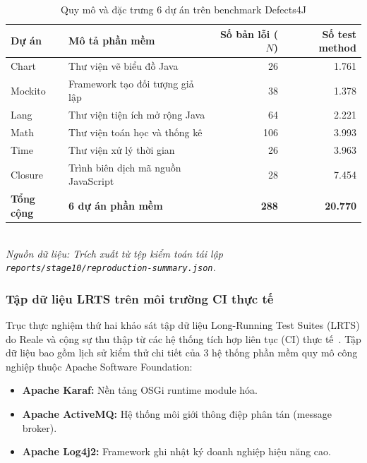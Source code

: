 \begin{table}[H]
\centering
\caption{Quy mô và đặc trưng 6 dự án trên benchmark Defects4J}
\label{tab:defects4j_stats}
\small
\begin{tabular*}{\textwidth}{@{\extracolsep{\fill}}llrr}
\toprule
\textbf{Dự án} & \textbf{Mô tả phần mềm} & \textbf{Số bản lỗi ($N$)} & \textbf{Số test method} \\
\midrule
Chart   & Thư viện vẽ biểu đồ Java            & 26  & 1.761 \\
Mockito & Framework tạo đối tượng giả lập     & 38  & 1.378 \\
Lang    & Thư viện tiện ích mở rộng Java      & 64  & 2.221 \\
Math    & Thư viện toán học và thống kê       & 106 & 3.993 \\
Time    & Thư viện xử lý thời gian            & 26  & 3.963 \\
Closure & Trình biên dịch mã nguồn JavaScript & 28  & 7.454 \\
\midrule
\textbf{Tổng cộng} & \textbf{6 dự án phần mềm} & \textbf{288} & \textbf{20.770} \\
\bottomrule
\end{tabular*}
\vspace{1mm}\\
\footnotesize{\textit{Nguồn dữ liệu: Trích xuất từ tệp kiểm toán tái lập \texttt{reports/stage10/reproduction-summary.json}.}}
\end{table}

\subsubsection{Tập dữ liệu LRTS trên môi trường CI thực tế}
\label{subsubsec:lrts_dataset}

Trục thực nghiệm thứ hai khảo sát tập dữ liệu Long-Running Test Suites (LRTS) do Reale và cộng sự thu thập từ các hệ thống tích hợp liên tục (CI) thực tế~\cite{dante2026}. Tập dữ liệu bao gồm lịch sử kiểm thử chi tiết của 3 hệ thống phần mềm quy mô công nghiệp thuộc Apache Software Foundation:
\begin{itemize}
    \item \textbf{Apache Karaf:} Nền tảng OSGi runtime module hóa.
    \item \textbf{Apache ActiveMQ:} Hệ thống môi giới thông điệp phân tán (message broker).
    \item \textbf{Apache Log4j2:} Framework ghi nhật ký doanh nghiệp hiệu năng cao.
\end{itemize}

